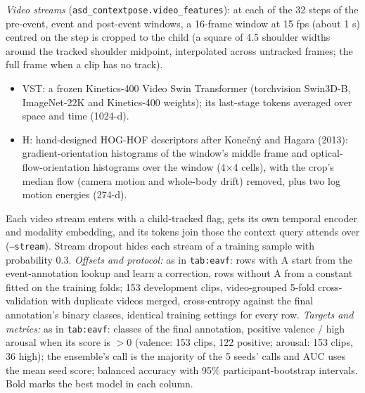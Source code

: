 \documentclass[11pt]{article}
\newcommand{\code}[1]{\texttt{#1}}
\begin{document}
\begin{table}[!htbp]
{\emph{Video streams} (\code{asd\_contextpose.video\_features}): at each of the 32 steps of the pre-event, event and post-event windows, a 16-frame window at 15 fps (about 1 s) centred on the step is cropped to the child (a square of 4.5 shoulder widths around the tracked shoulder midpoint, interpolated across untracked frames; the full frame when a clip has no track).
\begin{itemize}
  \item VST: a frozen Kinetics-400 Video Swin Transformer (torchvision Swin3D-B, ImageNet-22K and Kinetics-400 weights); its last-stage tokens averaged over space and time (1024-d).
  \item H: hand-designed HOG-HOF descriptors after Kone\v{c}n\'{y} and Hagara (2013): gradient-orientation histograms of the window's middle frame and optical-flow-orientation histograms over the window (4$\times$4 cells), with the crop's median flow (camera motion and whole-body drift) removed, plus two log motion energies (274-d).
\end{itemize}
Each video stream enters with a child-tracked flag, gets its own temporal encoder and modality embedding, and its tokens join those the context query attends over (\code{--stream}). Stream dropout hides each stream of a training sample with probability 0.3.
\emph{Offsets and protocol:} as in \code{tab:eavf}: rows with A start from the event-annotation lookup and learn a correction, rows without A from a constant fitted on the training folds; 153 development clips, video-grouped 5-fold cross-validation with duplicate videos merged, cross-entropy against the final annotation's binary classes, identical training settings for every row.
\emph{Targets and metrics:} as in \code{tab:eavf}: classes of the final annotation, positive valence / high arousal when its score is $> 0$ (valence: 153 clips, 122 positive; arousal: 153 clips, 36 high); the ensemble's call is the majority of the 5 seeds' calls and AUC uses the mean seed score; balanced accuracy with 95\% participant-bootstrap intervals. Bold marks the best model in each column.}
\end{table}
\end{document}
